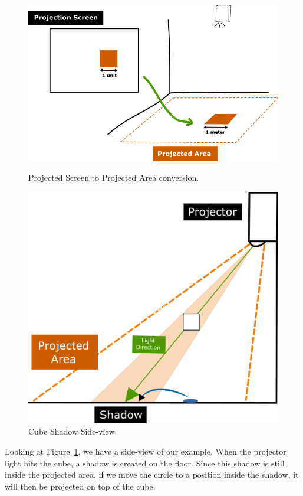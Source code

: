 \begin{figure}[!t]
  \centering
  \includegraphics[width=\linewidth]{imgs/impl/projection3}
    \caption{Projected Screen to Projected Area conversion.}
    \label{fig:projection3}
    \endminipage\hfill
{}
  \centering
  \includegraphics[width=\linewidth]{imgs/impl/projection5}
    \caption{Cube Shadow Side-view.}
    \label{fig:projection5}
    \endminipage
\end{figure}

Looking at Figure~\ref{fig:projection5}, we have a side-view of our example. When the projector light hits the cube, a shadow is created on the floor. 
Since this shadow is still inside the projected area, if we move the circle to a position inside the shadow, it will then be projected on top of the cube.

